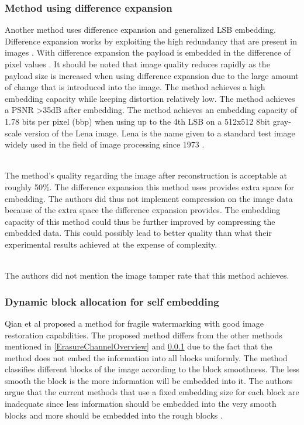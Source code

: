 \documentclass[12pt]{article}
\begin{document}
\subsubsection{Method using difference expansion}
\label{differenceExpansionOverview}
Another method \cite {tian2003high} uses difference expansion and generalized LSB embedding.
Difference expansion works by exploiting the high redundancy that are present in images \cite {tian2002reversible}.
With difference expansion the payload is embedded in the difference of pixel values \cite {tian2002reversible}. 
It should be noted that image quality reduces rapidly as the payload size is increased when using difference expansion due to the large amount of change that is introduced into the image. 
The method achieves a high embedding capacity while keeping distortion relatively low.
The method achieves a PSNR \textgreater 35dB after embedding.
The method achieves an embedding capacity of 1.78 bits per pixel (bbp) when using up to the 4th LSB on a 512x512 8bit gray-scale version of the Lena image. Lena is the name given to a standard test image widely used in the field of image processing since 1973 \cite{lenaOnlineArticle}.

\hspace{0pt} \\
The method's \cite {tian2003high} quality regarding the image after reconstruction is acceptable at roughly 50\%. 
The difference expansion this method uses provides extra space for embedding.
The authors did thus not implement compression on the image data because of the extra space the difference expansion provides.
The embedding capacity of this method could thus be further improved by compressing the embedded data. 
This could possibly lead to better quality than what their experimental results achieved at the expense of complexity.

\hspace{0pt} \\ 
The authors did not mention the image tamper rate that this method \cite {tian2003high} achieves.

\subsubsection{Dynamic block allocation for self embedding}
\label{DynamicBlockOverview}
Qian et al \cite{qian2011image} proposed a method for fragile watermarking with good image restoration capabilities.
The proposed method differs from the other methods mentioned in \ref{ErasureChannelOverview} and \ref{differenceExpansionOverview} due to the fact that the method does not embed the information into all blocks uniformly.
The method classifies different blocks of the image according to the block smoothness.
The less smooth the block is the more information will be embedded into it.
The authors argue that the current methods that use a fixed embedding size for each block are inadequate since less information should be embedded into the very smooth blocks and more should be embedded into the rough blocks \cite{qian2011image}.
\end{document}
